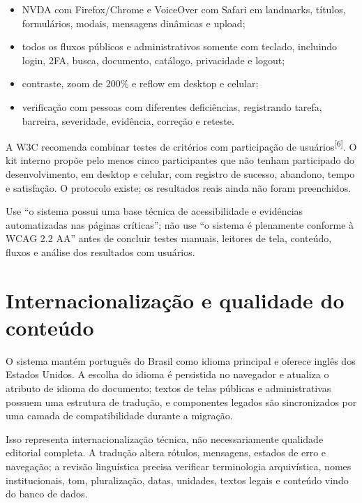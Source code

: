 \documentclass[11pt,a4paper]{article}
\newcommand{\sourcecite}[1]{\textsuperscript{[#1]}}
\begin{document}
\begin{itemize}
  \item NVDA com Firefox/Chrome e VoiceOver com Safari em landmarks, títulos, formulários, modais, mensagens dinâmicas e upload;
  \item todos os fluxos públicos e administrativos somente com teclado, incluindo login, 2FA, busca, documento, catálogo, privacidade e logout;
  \item contraste, zoom de 200\% e reflow em desktop e celular;
  \item verificação com pessoas com diferentes deficiências, registrando tarefa, barreira, severidade, evidência, correção e reteste.
\end{itemize}

A W3C recomenda combinar testes de critérios com participação de usuários\sourcecite{6}. O kit interno propõe pelo menos cinco participantes que não tenham participado do desenvolvimento, em desktop e celular, com registro de sucesso, abandono, tempo e satisfação. O protocolo existe; os resultados reais ainda não foram preenchidos.

\begin{attentionbox}[title=Formulação recomendada para a dissertação]
Use ``o sistema possui uma base técnica de acessibilidade e evidências automatizadas nas páginas críticas''; não use ``o sistema é plenamente conforme à WCAG 2.2 AA'' antes de concluir testes manuais, leitores de tela, conteúdo, fluxos e análise dos resultados com usuários.
\end{attentionbox}

\section{Internacionalização e qualidade do conteúdo}

O sistema mantém português do Brasil como idioma principal e oferece inglês dos Estados Unidos. A escolha do idioma é persistida no navegador e atualiza o atributo de idioma do documento; textos de telas públicas e administrativas possuem uma estrutura de tradução, e componentes legados são sincronizados por uma camada de compatibilidade durante a migração.

Isso representa internacionalização técnica, não necessariamente qualidade editorial completa. A tradução altera rótulos, mensagens, estados de erro e navegação; a revisão linguística precisa verificar terminologia arquivística, nomes institucionais, tom, pluralização, datas, unidades, textos legais e conteúdo vindo do banco de dados.
\end{document}
